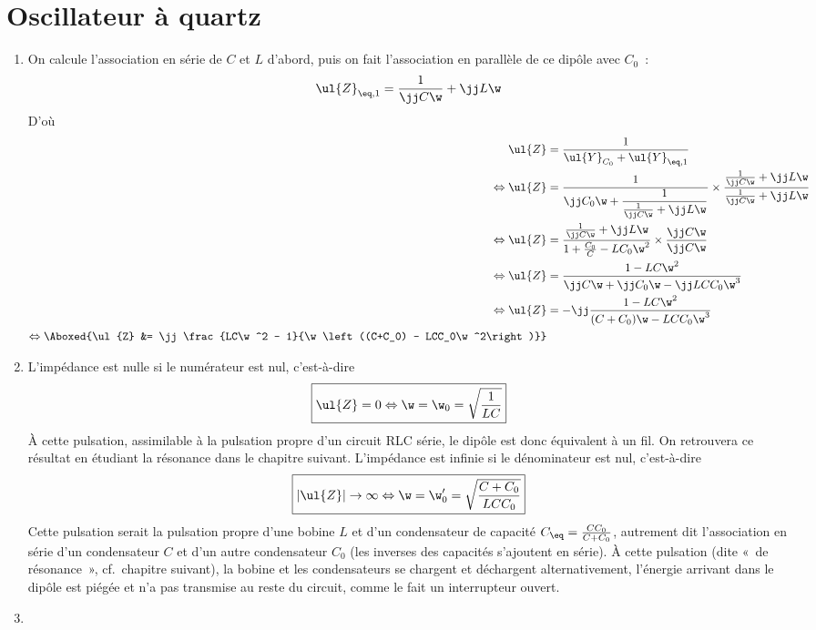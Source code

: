 \documentclass[a4paper, 12pt, final, garamond]{book}
\begin{document}
\section{Oscillateur à quartz}
\begin{enumerate}
    \item On calcule l'association en série de $C$ et $L$ d'abord, puis on fait
        l'association en parallèle de ce dipôle avec $C_0$~:
        \begin{gather*}
            \ul{Z}_{\eq, 1} = \frac{1}{\jj C\w} + \jj L \w
        \end{gather*}
        D'où
        \begin{align*}
            \ul{Z}
                &= \frac{1}{\ul{Y}_{C_0} + \ul{Y}_{\eq, 1}}\\
            \Leftrightarrow
            \ul{Z}
                &= \frac{1}{\jj C_0\w + \dfrac{1}{\frac{1}{\jj C\w} + \jj L\w}}
                \times
                \frac{\frac{1}{\jj C\w} + \jj L\w}{\frac{1}{\jj C\w} + \jj
                L\w}\\
            \Leftrightarrow
            \ul{Z}
                &= \frac{\frac{1}{\jj C\w} + \jj L\w}{1 + \frac{C_0}{C} -
                LC_0\w^2}
                \times
                \frac{\jj C\w}{\jj C\w}\\
            \Leftrightarrow
            \ul{Z}
                &= \frac{1 - LC\w^2}{\jj C\w + \jj C_0\w -\jj LCC_0\w^3}\\
            \Leftrightarrow
            \ul{Z}
                &= -\jj \frac{1 - LC\w^2}{(C+C_0)\w - LCC_0\w^3}\\
            \Leftrightarrow
            \Aboxed{\ul{Z}
                &= \jj \frac{LC\w^2 - 1}{\w\left((C+C_0) - LCC_0\w^2\right)}}
        \end{align*}
    \item L'impédance est nulle si le numérateur est nul, c'est-à-dire
        \[\boxed{\ul{Z} = 0 \Leftrightarrow \w = \w_0 = \sqrt{\frac{1}{LC}}}\]
        À cette pulsation, assimilable à la pulsation propre d'un circuit RLC
        série, le dipôle est donc équivalent à un fil. On retrouvera ce
        résultat en étudiant la résonance dans le chapitre suivant. \bigbreak
        L'impédance est infinie si le dénominateur est nul, c'est-à-dire
        \[\boxed{|\ul{Z}| \rightarrow \infty \Leftrightarrow \w = \w_0' =
            \sqrt{\frac{C+C_0}{LCC_0}}}\]
        Cette pulsation serait la pulsation propre d'une bobine $L$ et d'un
        condensateur de capacité $C_{\eq} = \frac{CC_0}{C+C_0}$, autrement dit
        l'association en série d'un condensateur $C$ et d'un autre condensateur
        $C_0$ (les inverses des capacités s'ajoutent en série). \smallbreak
        À cette pulsation (dite «~de résonance~», cf.\ chapitre suivant), la
        bobine et les condensateurs se chargent et déchargent alternativement,
        l'énergie arrivant dans le dipôle est piégée et n'a pas transmise au
        reste du circuit, comme le fait un interrupteur ouvert.
    \item~


\end{enumerate}
\end{document}
